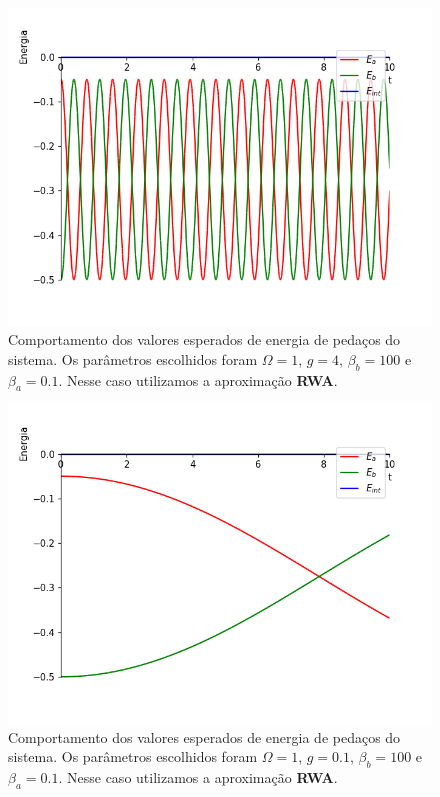 \begin{figure}[!hb]
\includegraphics[scale=.4]{Content/g_grande_rwa.png}
\caption{Comportamento dos valores esperados de energia de pedaços do sistema. Os parâmetros escolhidos foram $\Omega = 1$, $g = 4$, $\beta_b=100$ e $\beta_a=0.1$. Nesse caso utilizamos a aproximação \textbf{RWA}.}
\label{g_grande_rwa}
\end{figure}

\begin{figure}[!ht]
\includegraphics[scale=.4]{Content/g_pequeno_rwa.png}
\caption{Comportamento dos valores esperados de energia de pedaços do sistema. Os parâmetros escolhidos foram $\Omega = 1$, $g = 0.1$, $\beta_b=100$ e $\beta_a=0.1$. Nesse caso utilizamos a aproximação \textbf{RWA}.}
\label{g_pequeno_rwa}
\end{figure}
